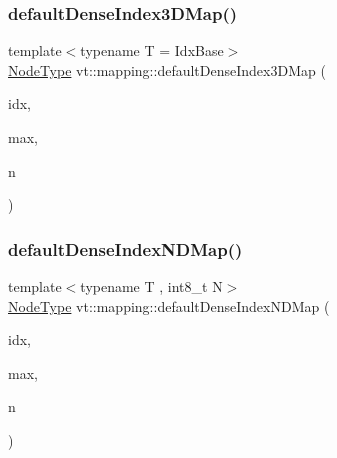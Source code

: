 \subsubsection{\texorpdfstring{default\+Dense\+Index3\+D\+Map()}{defaultDenseIndex3DMap()}}
{\footnotesize\ttfamily template$<$typename T  = Idx\+Base$>$ \\
\hyperlink{namespacevt_a866da9d0efc19c0a1ce79e9e492f47e2}{Node\+Type} vt\+::mapping\+::default\+Dense\+Index3\+D\+Map (\begin{DoxyParamCaption}\item[{\hyperlink{namespacevt_1_1mapping_aacc737158b6517f2d760ffc8d1b5abca}{Idx3\+D\+Ptr}$<$ T $>$}]{idx,  }\item[{\hyperlink{namespacevt_1_1mapping_aacc737158b6517f2d760ffc8d1b5abca}{Idx3\+D\+Ptr}$<$ T $>$}]{max,  }\item[{\hyperlink{namespacevt_a866da9d0efc19c0a1ce79e9e492f47e2}{Node\+Type}}]{n }\end{DoxyParamCaption})}

\mbox{\label{namespacevt_1_1mapping_a39633710d765933d6d91b8bb9818fcc7}} 
\subsubsection{\texorpdfstring{default\+Dense\+Index\+N\+D\+Map()}{defaultDenseIndexNDMap()}}
{\footnotesize\ttfamily template$<$typename T , int8\+\_\+t N$>$ \\
\hyperlink{namespacevt_a866da9d0efc19c0a1ce79e9e492f47e2}{Node\+Type} vt\+::mapping\+::default\+Dense\+Index\+N\+D\+Map (\begin{DoxyParamCaption}\item[{\hyperlink{namespacevt_1_1mapping_ab77f5302cd346d499e48a8c796043746}{Idx\+N\+D\+Ptr}$<$ T, N $>$}]{idx,  }\item[{\hyperlink{namespacevt_1_1mapping_ab77f5302cd346d499e48a8c796043746}{Idx\+N\+D\+Ptr}$<$ T, N $>$}]{max,  }\item[{\hyperlink{namespacevt_a866da9d0efc19c0a1ce79e9e492f47e2}{Node\+Type}}]{n }\end{DoxyParamCaption})}

\mbox{\label{namespacevt_1_1mapping_a2d49151f03d4ce393b01c620f6b18517}} 
